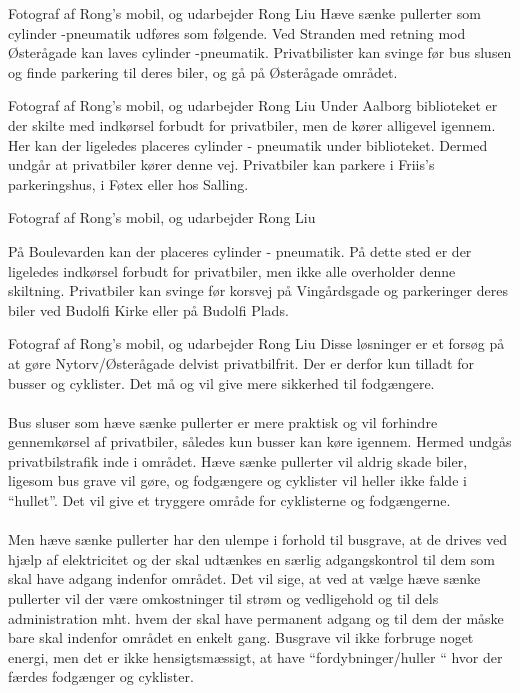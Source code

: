                                            
                                         Fotograf af Rong’s mobil, og udarbejder Rong Liu
Hæve sænke pullerter som cylinder -pneumatik udføres som følgende. Ved Stranden med retning mod Østerågade kan laves cylinder -pneumatik. Privatbilister kan svinge før bus slusen og finde parkering til deres biler, og gå på Østerågade området. 
                                        
                                        
                                        
                                         Fotograf af Rong’s mobil, og udarbejder Rong Liu
Under Aalborg biblioteket er der skilte med indkørsel forbudt for privatbiler, men de kører alligevel igennem. Her kan der ligeledes placeres cylinder - pneumatik under biblioteket. Dermed undgår at privatbiler kører denne vej. Privatbiler kan parkere i Friis’s parkeringshus, i Føtex eller hos Salling.                         
                                                   
                                                   
                                                   
                                        Fotograf af Rong’s mobil, og udarbejder Rong Liu

På Boulevarden kan der placeres cylinder - pneumatik. På dette sted er der ligeledes indkørsel forbudt for privatbiler, men ikke alle overholder denne skiltning. Privatbiler kan svinge før korsvej på Vingårdsgade og parkeringer deres biler ved Budolfi Kirke eller på Budolfi Plads. 
                                                
                                                
                                       Fotograf af Rong’s mobil, og udarbejder Rong Liu
Disse løsninger er et forsøg på at gøre Nytorv/Østerågade delvist privatbilfrit. Der er derfor kun tilladt for busser og cyklister. Det må og vil give mere sikkerhed til fodgængere.
\\\\
Bus sluser som hæve sænke pullerter er mere praktisk og vil forhindre gennemkørsel af privatbiler, således kun busser kan køre igennem. Hermed undgås privatbilstrafik inde i området. Hæve sænke pullerter vil aldrig skade biler, ligesom bus grave vil gøre, og fodgængere og cyklister vil heller ikke falde i “hullet”. Det vil give et tryggere område for cyklisterne og fodgængerne. 
\\\\
Men hæve sænke pullerter har den ulempe i forhold til busgrave, at de drives ved hjælp af elektricitet og der skal udtænkes en særlig adgangskontrol til dem som skal have adgang indenfor området. Det vil sige, at ved at vælge hæve sænke pullerter vil der være omkostninger til strøm og vedligehold og til dels administration mht. hvem der skal have permanent adgang og til dem der måske bare skal indenfor området en enkelt gang. Busgrave vil ikke forbruge noget energi, men det er ikke hensigtsmæssigt, at have “fordybninger/huller “ hvor der færdes fodgænger og cyklister. 
 
